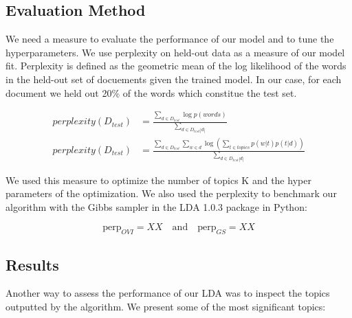 \documentclass[twoside]{article}
\begin{document}
\begin{multicols}{2}
\subsection{Evaluation Method}

We need a measure to evaluate the performance of our model and to tune the hyperparameters. We use perplexity on held-out data as a measure of our model fit. Perplexity is defined as the geometric mean of the log likelihood of the words in the held-out set of docuements given the trained model. In our case, for each document we held out 20\% of the words which constitue the test set.

\begin{align*}
	perplexity(D_{test}) & = \frac{\sum\limits_{d \in D_{test}} \log p(words)}{\sum\limits_{d \in D_{test}|d|}}\\
	perplexity(D_{test}) & = \frac{\sum\limits_{d \in D_{test}} \sum\limits_{w \in d} \log \left( \sum_{t \in topics} p(w|t)p(t|d) \right)}{\sum\limits_{d \in D_{test}|d|}}
\end{align*}

\noindent We used this measure to optimize the number of topics K and the hyper parameters of the optimization. We also used the perplexity to benchmark our algorithm with the Gibbs sampler in the LDA 1.0.3 package in Python:

$$\text{perp}_{OVI} = XX \quad \text{and} \quad \text{perp}_{GS} = XX$$

\subsection{Results}
Another way to assess the performance of our LDA was to inspect the topics outputted by the algorithm. We present some of the most significant topics:\\


\end{multicols}
\end{document}
